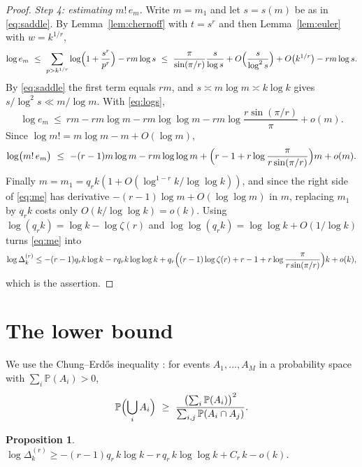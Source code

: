 \documentclass[11pt,reqno]{amsart}
\theoremstyle{plain}
\newtheorem{proposition}[theorem]{Proposition}
\theoremstyle{definition}
\numberwithin{equation}{section}
\begin{document}
\begin{proof}
\smallskip
\emph{Step 4: estimating $m!\,e_m$.}
Write $m=m_1$ and let $s=s(m)$ be as in \eqref{eq:saddle}. By Lemma~\ref{lem:chernoff} with
$t=s^{r}$ and then Lemma~\ref{lem:euler} with $w=k^{1/r}$,
\[
  \log e_m\ \le\ \sum_{p>k^{1/r}}\log\Bigl(1+\frac{s^{r}}{p^{r}}\Bigr)-rm\log s
  \ \le\ \frac{\pi}{\sin(\pi/r)}\frac{s}{\log s}+O\Bigl(\frac{s}{\log^{2}s}\Bigr)
  +O\bigl(k^{1/r}\bigr)-rm\log s .
\]
By \eqref{eq:saddle} the first term equals $rm$, and $s\asymp m\log m\asymp k\log k$ gives
$s/\log^{2}s\ll m/\log m$. With \eqref{eq:logs},
\[
  \log e_m\ \le\ rm-rm\log m-rm\log\log m-rm\log\frac{r\sin(\pi/r)}{\pi}+o(m).
\]
Since $\log m!=m\log m-m+O(\log m)$,
\begin{equation}\label{eq:me}
  \log\bigl(m!\,e_m\bigr)\ \le\ -(r-1)m\log m-rm\log\log m
  +\Bigl(r-1+r\log\frac{\pi}{r\sin(\pi/r)}\Bigr)m+o(m).
\end{equation}
Finally $m=m_1=q_rk(1+O(\log^{1-r}k/\log\log k))$, and since the right side of
\eqref{eq:me} has derivative $-(r-1)\log m+O(\log\log m)$ in $m$, replacing $m_1$ by $q_rk$
costs only $O(k/\log\log k)=o(k)$. Using
$\log(q_rk)=\log k-\log\zeta(r)$ and $\log\log(q_rk)=\log\log k+O(1/\log k)$ turns
\eqref{eq:me} into
\[
  \log\Delta^{(r)}_k\le-(r-1)q_rk\log k-rq_rk\log\log k
  +q_r\Bigl((r-1)\log\zeta(r)+r-1+r\log\frac{\pi}{r\sin(\pi/r)}\Bigr)k+o(k),
\]
which is the assertion.
\end{proof}

\section{The lower bound}\label{sec:lower}

We use the Chung--Erd\H{o}s inequality \cite{ChungErdos}: for events $A_1,\dots,A_M$ in a
probability space with $\sum_i\mathbb P(A_i)>0$,
\begin{equation}\label{eq:CE}
  \mathbb P\Bigl(\bigcup_iA_i\Bigr)\ \ge\
  \frac{\bigl(\sum_i\mathbb P(A_i)\bigr)^{2}}{\sum_{i,j}\mathbb P(A_i\cap A_j)} .
\end{equation}

\begin{proposition}\label{prop:lower}
$\log\Delta^{(r)}_k\ge-(r-1)q_r\,k\log k-r\,q_r\,k\log\log k+C_r\,k-o(k)$.
\end{proposition}
\end{document}
